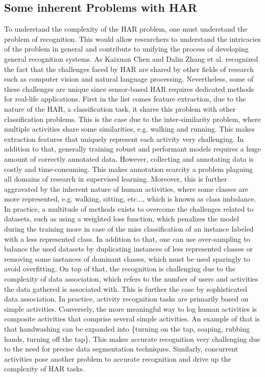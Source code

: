 		\subsection{Some inherent Problems with HAR}\label{subsec:probHAR}
		To understand the complexity of the HAR problem, one must understand the problem of recognition. This would allow researchers to understand the intricacies of the problem in general and contribute to unifying the process of developing general recognition systems. As Kaixuan Chen and Dalin Zhang et al. recognized the fact that the challenges faced by HAR are shared by other fields of research such as computer vision and natural language processing\cite{chen2021deep}. Nevertheless, some of these challenges are unique since sensor-based HAR requires dedicated methods for real-life applications.\newline
		First in the list comes feature extraction, due to the nature of the HAR, a classification task, it shares this problem with other classification problems. This is the case due to the inter-similarity problem, where multiple activities share some similarities, e.g. walking and running. This makes extraction features that uniquely represent each activity very challenging. In addition to that, generally training robust and performant models requires a huge amount of correctly annotated data. However, collecting and annotating data is costly and time-consuming. This makes annotation scarcity a problem plaguing all domains of research in supervised learning. Moreover, this is further aggravated by the inherent nature of human activities, where some classes are more represented, e.g. walking, sitting, etc..., which is known as class imbalance. In practice, a multitude of methods exists to overcome the challenges related to datasets, such as using a weighted loss function, which penalizes the model during the training more in case of the miss classification of an instance labeled with a less represented class. In addition to that, one can use over-sampling to balance the used datasets by duplicating instances of less represented classes or removing some instances of dominant classes, which must be used sparingly to avoid overfitting\cite{chen2021deep}.\newline
		On top of that, the recognition is challenging due to the complexity of data association, which refers to the number of users and activities the data gathered is associated with. This is further the case by sophisticated data association. In practice, activity recognition tasks are primarily based on simple activities. Conversely, the more meaningful way to log human activities is composite activities that comprise several simple activities. An example of that is that handwashing can be expanded into \{turning on the tap, soaping, rubbing hands, turning off the tap\}\cite{chen2021deep}. This makes accurate recognition very challenging due to the need for precise data segmentation techniques. Similarly, concurrent activities pose another problem to accurate recognition and drive up the complexity of HAR tasks.\newline
